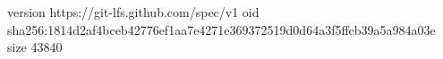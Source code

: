 version https://git-lfs.github.com/spec/v1
oid sha256:1814d2af4bceb42776ef1aa7e4271e369372519d0d64a3f5ffcb39a5a984a03e
size 43840
